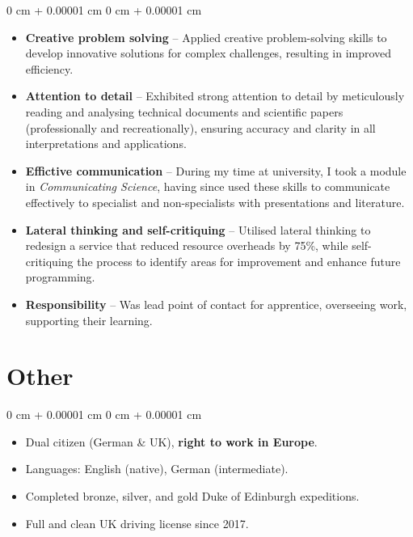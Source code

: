 \documentclass[10pt, letterpaper]{article}
\newenvironment{highlights}{
    \begin{itemize}[
        topsep=0.2 cm,
        parsep=0.2 cm,
        partopsep=0pt,
        itemsep=0.025 cm,
        leftmargin=0 cm + 10pt
    ]
}{
    \end{itemize}
}
\newenvironment{onecolentry}{
    \begin{adjustwidth}{
        0 cm + 0.00001 cm
    }{
        0 cm + 0.00001 cm
    }
}{
    \end{adjustwidth}
}
\begin{document}
        \begin{onecolentry}
            \begin{highlights}
                \item \textbf{Creative problem solving} -- Applied creative problem-solving skills to develop innovative solutions for complex challenges, resulting in improved efficiency.
                \item \textbf{Attention to detail} -- Exhibited strong attention to detail by meticulously reading and analysing technical documents and scientific papers (professionally and recreationally), ensuring accuracy and clarity in all interpretations and applications.
                \item \textbf{Effictive communication} -- During my time at university, I took a module in \textit{Communicating Science}, having since used these skills to communicate effectively to specialist and non-specialists with presentations and literature. 
                \item \textbf{Lateral thinking and self-critiquing} -- Utilised lateral thinking to redesign a service that reduced resource overheads by 75\%, while self-critiquing the process to identify areas for improvement and enhance future programming.
                \item \textbf{Responsibility} -- Was lead point of contact for apprentice, overseeing work, supporting their learning.
            \end{highlights}
        \end{onecolentry}

    \section{Other}

        \begin{onecolentry}
            \begin{highlights}
            \item Dual citizen (German \& UK), \textbf{right to work in Europe}.
                \item Languages: English (native), German (intermediate).
                \item Completed bronze, silver, and gold Duke of Edinburgh expeditions.
                \item Full and clean UK driving license since 2017.
            \end{highlights}
        \end{onecolentry}
\end{document}
